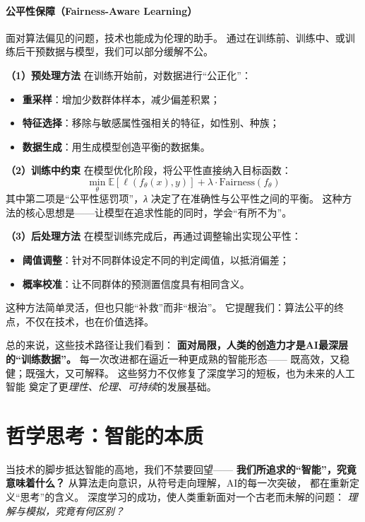 \paragraph{公平性保障（Fairness-Aware Learning）}  
面对算法偏见的问题，技术也能成为伦理的助手。  
通过在训练前、训练中、或训练后干预数据与模型，我们可以部分缓解不公。  

\textbf{（1）预处理方法}  
在训练开始前，对数据进行“公正化”：  
\begin{itemize}
\item \textbf{重采样}：增加少数群体样本，减少偏差积累；  
\item \textbf{特征选择}：移除与敏感属性强相关的特征，如性别、种族；  
\item \textbf{数据生成}：用生成模型创造平衡的数据集。  
\end{itemize}

\textbf{（2）训练中约束}  
在模型优化阶段，将公平性直接纳入目标函数：  
$$\min_\theta \mathbb{E}[\ell(f_\theta(x), y)] + \lambda \cdot \text{Fairness}(f_\theta)$$  
其中第二项是“公平性惩罚项”，\textit{λ} 决定了在准确性与公平性之间的平衡。  
这种方法的核心思想是——让模型在追求性能的同时，学会“有所不为”。

\textbf{（3）后处理方法}  
在模型训练完成后，再通过调整输出实现公平性：  
\begin{itemize}
\item \textbf{阈值调整}：针对不同群体设定不同的判定阈值，以抵消偏差；  
\item \textbf{概率校准}：让不同群体的预测置信度具有相同含义。  
\end{itemize}
这种方法简单灵活，但也只能“补救”而非“根治”。  
它提醒我们：算法公平的终点，不仅在技术，也在价值选择。

总的来说，这些技术路径让我们看到：  
\textbf{面对局限，人类的创造力才是AI最深层的“训练数据”。}  
每一次改进都在逼近一种更成熟的智能形态——  
既高效，又稳健；既强大，又可解释。  
这些努力不仅修复了深度学习的短板，也为未来的人工智能  
奠定了更\textit{理性、伦理、可持续}的发展基础。

\section{哲学思考：智能的本质}

当技术的脚步抵达智能的高地，我们不禁要回望——  
\textbf{我们所追求的“智能”，究竟意味着什么？}  
从算法走向意识，从符号走向理解，AI的每一次突破，  
都在重新定义“思考”的含义。  
深度学习的成功，使人类重新面对一个古老而未解的问题：  
\textit{理解与模拟，究竟有何区别？}

